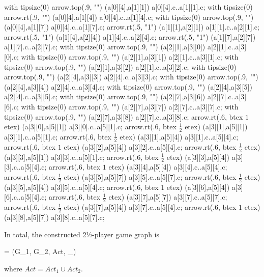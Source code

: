     with tipsize(0) arrow.top(.9, "") (a[0][4],a[1][1]) a[0][4].c..a[1][1].c;
    with tipsize(0) arrow.rt(.9, "") (a[0][4],a[1][4]) a[0][4].c..a[1][4].c;
    with tipsize(0) arrow.top(.9, "") (a[0][4],a[1][7]) a[0][4].c..a[1][7].c;
    arrow.rt(.5, "1") (a[1][1],a[2][1]) a[1][1].c..a[2][1].c;
    arrow.rt(.5, "1") (a[1][4],a[2][4]) a[1][4].c..a[2][4].c;
    arrow.rt(.5, "1") (a[1][7],a[2][7]) a[1][7].c..a[2][7].c;
    with tipsize(0) arrow.top(.9, "") (a[2][1],a[3][0]) a[2][1].c..a[3][0].c;
    with tipsize(0) arrow.top(.9, "") (a[2][1],a[3][1]) a[2][1].c..a[3][1].c;
    with tipsize(0) arrow.top(.9, "") (a[2][1],a[3][2]) a[2][1].c..a[3][2].c;
    with tipsize(0) arrow.top(.9, "") (a[2][4],a[3][3]) a[2][4].c..a[3][3].c;
    with tipsize(0) arrow.top(.9, "") (a[2][4],a[3][4]) a[2][4].c..a[3][4].c;
    with tipsize(0) arrow.top(.9, "") (a[2][4],a[3][5]) a[2][4].c..a[3][5].c;
    with tipsize(0) arrow.top(.9, "") (a[2][7],a[3][6]) a[2][7].c..a[3][6].c;
    with tipsize(0) arrow.top(.9, "") (a[2][7],a[3][7]) a[2][7].c..a[3][7].c;
    with tipsize(0) arrow.top(.9, "") (a[2][7],a[3][8]) a[2][7].c..a[3][8].c;
    arrow.rt(.6, btex $1$ etex) (a[3][0],a[5][1]) a[3][0].c..a[5][1].c;
    arrow.rt(.6, btex $\frac{1}{2}$ etex) (a[3][1],a[5][1]) a[3][1].c..a[5][1].c;
    arrow.rt(.6, btex $\frac{1}{2}$ etex) (a[3][1],a[5][4]) a[3][1].c..a[5][4].c;
    arrow.rt(.6, btex $1$ etex) (a[3][2],a[5][4]) a[3][2].c..a[5][4].c;
    arrow.rt(.6, btex $\frac{1}{2}$ etex) (a[3][3],a[5][1]) a[3][3].c..a[5][1].c;
    arrow.rt(.6, btex $\frac{1}{2}$ etex) (a[3][3],a[5][4]) a[3][3].c..a[5][4].c;
    arrow.rt(.6, btex $1$ etex) (a[3][4],a[5][4]) a[3][4].c..a[5][4].c;
    arrow.rt(.6, btex $\frac{1}{2}$ etex) (a[3][5],a[5][7]) a[3][5].c..a[5][7].c;
    arrow.rt(.6, btex $\frac{1}{2}$ etex) (a[3][5],a[5][4]) a[3][5].c..a[5][4].c;
    arrow.rt(.6, btex $1$ etex) (a[3][6],a[5][4]) a[3][6].c..a[5][4].c;
    arrow.rt(.6, btex $\frac{1}{2}$ etex) (a[3][7],a[5][7]) a[3][7].c..a[5][7].c;
    arrow.rt(.6, btex $\frac{1}{2}$ etex) (a[3][7],a[5][4]) a[3][7].c..a[5][4].c;
    arrow.rt(.6, btex $1$ etex) (a[3][8],a[5][7]) a[3][8].c..a[5][7].c;
\stopreusableMPgraphic

\startsubsection[title={Synopsis},reference=sec:abstraction-graph-synopsis]

    In total, the constructed 2½-player game graph is

    \startformula
        \GameGraph = (G_1, G_2, Act, \Transition_\GameGraph) \EndComma
    \stopformula

    where $Act = Act_1 \cup Act_2$.

